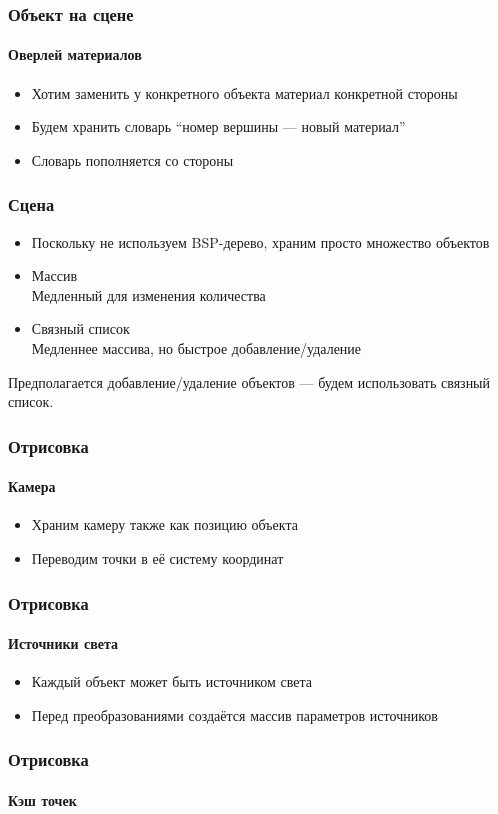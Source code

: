 \documentclass{beamer}
\begin{document}
\begin{frame}
\begin{frame}
\frametitle{Объект на сцене}
\framesubtitle{Оверлей материалов}

\begin{itemize}
\item Хотим заменить у конкретного объекта материал конкретной стороны
\item Будем хранить словарь ``номер вершины --- новый материал''
\item Словарь пополняется со стороны
\end{itemize}
\end{frame}

\begin{frame}
\frametitle{Сцена}

\begin{itemize}
\item Поскольку не используем BSP-дерево, храним просто множество объектов
\item Массив \\
Медленный для изменения количества
\item Связный список \\
Медленнее массива, но быстрое добавление/удаление
\end{itemize}
Предполагается добавление/удаление объектов --- будем использовать связный список.
\end{frame}

\begin{frame}
\frametitle{Отрисовка}
\framesubtitle{Камера}

\begin{itemize}
\item Храним камеру также как позицию объекта
\item Переводим точки в её систему координат
\end{itemize}
\end{frame}

\begin{frame}
\frametitle{Отрисовка}
\framesubtitle{Источники света}

\begin{itemize}
\item Каждый объект может быть источником света
\item Перед преобразованиями создаётся массив параметров источников
\end{itemize}
\end{frame}

\begin{frame}
\frametitle{Отрисовка}
\framesubtitle{Кэш точек}


\end{frame}
\end{frame}
\end{document}
